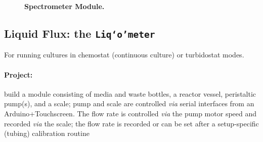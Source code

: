 \documentclass[12pt,a4paper]{scrartcl}
\newcommand{\liqometer}[0]{\texttt{Liq`o'meter}}
\begin{document}
\begin{figure}[ht]
  \begin{minipage}{.49\textwidth}
  \end{minipage}
  \begin{minipage}{.49\textwidth}
  \end{minipage}
\caption[]{\textbf{Spectrometer Module.}}
\end{figure}

\newpage
\subsection{Liquid Flux: the \liqometer{}} 
\label{cult}

For running cultures in chemostat (continuous culture) or turbidostat modes. 

\paragraph{Project:} build a module consisting of media and waste bottles, 
a reactor vessel, peristaltic pump(s), and a scale; pump and scale are
controlled \textit{via} serial interfaces from an
Arduino+Touchscreen. The flow rate is controlled \textit{via} the pump
motor speed and recorded \textit{via} the scale; the flow rate is
recorded or can be set after a setup-specific (tubing) calibration
routine
\end{document}
